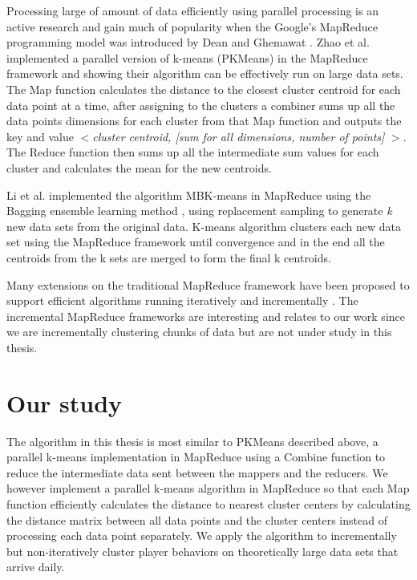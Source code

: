 Processing large of amount of data efficiently using parallel processing is an active research and gain much of popularity when the Google's MapReduce programming model was introduced by Dean and Ghemawat \citep{Dean:2004}. Zhao et al. \citep{Zhao:2009} implemented a parallel version of k-means (PKMeans) in the MapReduce framework and showing their algorithm can be effectively run on large data sets. The Map function calculates the distance to the closest cluster centroid for each data point at a time, after assigning to the clusters a combiner sums up all the data points dimensions for each cluster from that Map function and outputs the key and value $<$\textit{cluster centroid, [sum for all dimensions, number of points]} $>$. The Reduce function then sums up all the intermediate sum values for each cluster and calculates the mean for the new centroids. 

Li et al. \citep{Li:2011} implemented the algorithm MBK-means in MapReduce using the Bagging ensemble learning method \citep{Breiman:1996}, using replacement sampling to generate  \textit{k} new data sets from the original data. K-means algorithm clusters each new data set using the MapReduce framework until convergence and in the end all the centroids from the k sets are merged to form the final k centroids.

Many extensions on the traditional MapReduce framework have been proposed to support efficient algorithms running iteratively \citep{Condie:2010HadoopOnline, Ekanayake:2010Twister, Zaharia:2010Spark, Bu:2010HaLoop, Bu:2012HaLoop, Yan:2012IncMr} and incrementally \citep{Bhatotia:2011Incoop, Yan:2012IncMr, Bhatotia:2012Slider}. The incremental MapReduce frameworks are interesting and relates to our work since we are incrementally clustering chunks of data but are not under study in this thesis.

\section{Our study}
The algorithm in this thesis is most similar to PKMeans \citep{Zhao:2009} described above, a parallel k-means implementation in MapReduce using a Combine function to reduce the intermediate data sent between the mappers and the reducers. We however implement a parallel k-means algorithm in MapReduce so that each Map function efficiently calculates the distance to nearest cluster centers by calculating the distance matrix between all data points and the cluster centers instead of processing each data point separately. We apply the algorithm to incrementally but non-iteratively cluster player behaviors on theoretically large data sets that arrive daily. 

